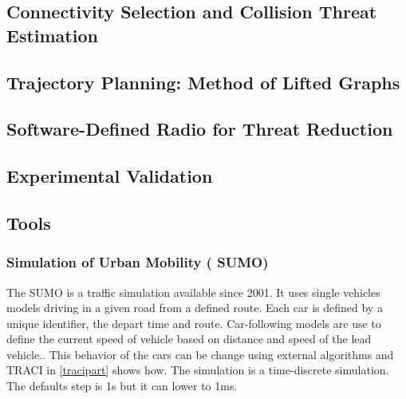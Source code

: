 

\subsection{Connectivity Selection and Collision Threat Estimation}\label{sec-conn-selection}

\subsection{Trajectory Planning: Method of Lifted Graphs}


\subsection{Software-Defined Radio for Threat Reduction} 
\label{sec-sdr}

\subsection{Experimental Validation}


\subsection{Tools}

\subsubsection{Simulation of Urban Mobility ( SUMO)}
The SUMO\cite{SUMO2012} is a traffic simulation available since 2001. It uses single vehicles models driving in a given road from a defined route. Each car is defined by a unique identifier, the depart time and route. Car-following models are use to define the current speed of vehicle based on distance and speed of the lead vehicle.\cite{krauss1998microscopic}. This behavior of the cars can be change using external algorithms and TRACI in \ref{tracipart} shows how. The simulation is a time-discrete simulation. The defaults step is 1s but it can lower to 1ms.   

